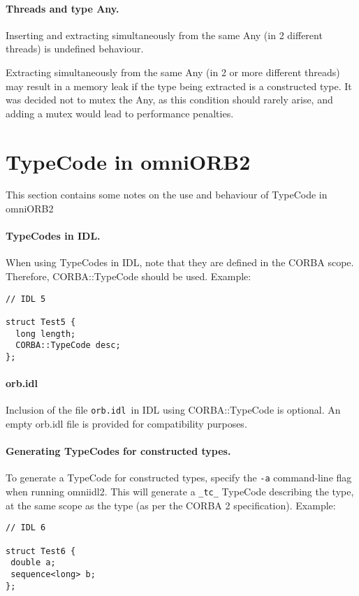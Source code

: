 \documentclass[11pt,twoside,onecolumn]{book}
\begin{document}
\paragraph*{Threads and type Any.}
Inserting and extracting simultaneously from the same Any (in 2 different 
threads) is undefined behaviour.

Extracting simultaneously from the same Any (in 2 or more different threads)
may result in a memory leak if the type being extracted is a constructed type.
It was decided not to mutex the Any, as this condition should rarely arise, 
and adding a mutex would lead to performance penalties.


\section{TypeCode in omniORB2}

This section contains some notes on the use and behaviour of TypeCode in 
omniORB2

\paragraph*{TypeCodes in IDL.}
When using TypeCodes in IDL, note that they are defined in the CORBA scope.
Therefore, CORBA::TypeCode should be used. Example:
{\small
\begin{verbatim}
// IDL 5

struct Test5 {
  long length;
  CORBA::TypeCode desc;
};
\end{verbatim}
}

\paragraph*{orb.idl}
Inclusion of the file {\tt orb.idl }in IDL using CORBA::TypeCode is optional.
An empty orb.idl file is provided for compatibility purposes.

\paragraph*{Generating TypeCodes for constructed types.}
To generate a TypeCode for constructed types, specify the {\tt -a}
command-line flag when running omniidl2. This will generate a {\tt \_tc\_} 
TypeCode describing the type, at the same scope as the type (as per the 
CORBA 2 specification). Example:

{\small
\begin{verbatim}
// IDL 6

struct Test6 {
 double a;
 sequence<long> b;
};
\end{verbatim}
}
\end{document}
